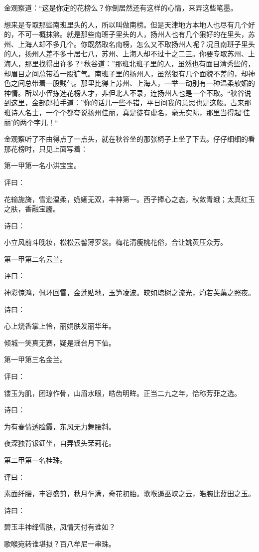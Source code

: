 \documentclass[12pt,UTF8]{ctexbook}
\begin{document}
{{{金观察道：“这是你定的花榜么？你倒居然还有这样的心情，来弄这些笔墨。

想来是专取那些南班里头的人，所以叫做南榜。但是天津地方本地人也尽有几个好的，不可一概抹煞。就是那些南班子里头的人，扬州人也有几个狠好的在里头，苏州、上海人却不多几个。你既然取名南榜，怎么又不取扬州人呢？况且南班子里头的人，扬州人差不多十居七八，苏州、上海人却不过十之二三。你要专取苏州、上海人，那里找得出许多？“秋谷道：”那班北班子里的人，虽然也有面目清秀些的，却眉目之间总带着一股犷气。南班子里的扬州人，虽然狠有几个面貌不差的，却神色之间总带着一股贱气。那里比得上苏州、上海人，一举一动别有一种温柔软媚的神情。所以小侄拣选花榜人才，非但北人不录，连扬州人也是一个不取。“秋谷说到这里，金部郎拍手道：”你的话儿一些不错，平日间我的意思也是这般。古来那班诗人名士，一个个都夸说扬州佳丽，真是徒有虚名，毫无实际，那里当得起‘佳丽’的两个字儿！“

金观察听了不由得点了一点头，就在秋谷坐的那张椅子上坐了下去。仔仔细细的看那花榜时，只见上面写着：

第一甲第一名小洪宝宝。

评曰：

花输旎旖，雪逊温柔，姽婳无双，丰神第一。西子捧心之态，秋敛青蛾；太真红玉之肤，香融宝靥。

诗曰：

小立风前斗晚妆，松松云髻薄罗裳。梅花清瘦桃花俗，合让姚黄压众芳。

第一甲第二名云兰。

评曰：

神彩惊鸿，佩环回雪，金莲贴地，玉笋凌波。皎如琼树之流光，灼若芙蕖之照夜。

诗曰：

心上烧香掌上怜，丽娟肤发丽华年。

倾城一笑真无赛，疑是瑶台月下仙。

第一甲第三名金兰。

评曰：

镂玉为肌，团琼作骨，山眉水眼，皓齿明眸。正当二九之年，恰称芳菲之选。

诗曰：

为有春情透脸霞，东风无力舞腰斜。

夜深独背银釭坐，自弄钗头茉莉花。

第二甲第一名桂珠。

评曰：

素面纤腰，丰容盛剪，秋月乍满，奇花初胎。歌喉遏巫峡之云，皓腕比蓝田之玉。

诗曰：

碧玉丰神绛雪肤，凤情天付有谁如？

歌喉宛转谁堪拟？百八牟尼一串珠。

}}}
\end{document}

